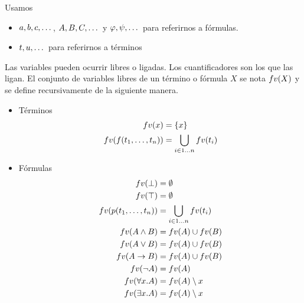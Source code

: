 \begin{notation*}
    Usamos
    \begin{itemize}
        \item $a, b, c, \dots$, $A, B, C, \dots$ y $\varphi, \psi, \dots$ para referirnos a fórmulas.
        \item $t, u, \dots$ para referirnos a términos
    \end{itemize}
\end{notation*}

\begin{definition}
    Las variables pueden ocurrir libres o ligadas. Los cuantificadores son los que las ligan. El conjunto de variables libres de un término o fórmula $X$ se nota $fv(X)$ y se define recursivamente de la siguiente manera.

    \begin{itemize}
        \item Términos
        \begin{align*}
            fv(x) &= \{ x \}\\
            fv(f(t_1, \dots, t_n)) &= \bigcup_{i \in 1\dots n} fv(t_i) 
        \end{align*}
    
        \item Fórmulas
        \begin{align*}
            fv(\bot) &=\emptyset\\
            fv(\top) &=\emptyset \\
            fv(p(t_1, \dots, t_n)) &= \bigcup_{i \in 1\dots n} fv(t_i) \\
            fv(A \wedge B) &= fv(A) \cup fv(B)\\
            fv(A \vee B) &=fv(A) \cup fv(B)\\
            fv(A \to B) &=fv(A) \cup fv(B)\\
            fv(\neg A) &=fv(A)\\
            fv(\forall x . A) &= fv(A) \setminus x \\
            fv(\exists x . A) &= fv(A) \setminus x
        \end{align*}
    \end{itemize}
\end{definition}


